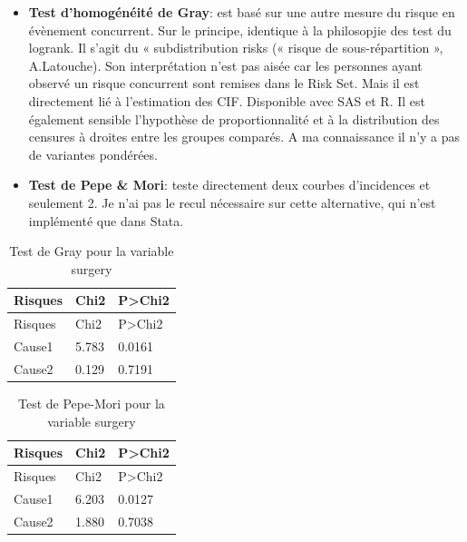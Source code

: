 \documentclass[
  12pt,
  letterpaper,
  DIV=11,
  numbers=noendperiod,
  onepage,
  openany]{scrreprt}
\begin{document}
\begin{itemize}
\item
  \textbf{Test d'homogénéité de Gray}: est basé sur une autre mesure du
  risque en évènement concurrent. Sur le principe, identique à la
  philosopjie des test du logrank. Il s'agit du « subdistribution risks
  (« risque de sous-répartition », A.Latouche). Son interprétation n'est
  pas aisée car les personnes ayant observé un risque concurrent sont
  remises dans le Risk Set. Mais il est directement lié à l'estimation
  des CIF. Disponible avec SAS et R. Il est également sensible
  l'hypothèse de proportionnalité et à la distribution des censures à
  droites entre les groupes comparés. A ma connaissance il n'y a pas de
  variantes pondérées.
\item
  \textbf{Test de Pepe \& Mori}: teste directement deux courbes
  d'incidences et seulement 2. Je n'ai pas le recul nécessaire sur cette
  alternative, qui n'est implémenté que dans Stata.
\end{itemize}

\begin{longtable}[]{@{}lll@{}}
\caption{Test de Gray pour la variable surgery}\tabularnewline
\toprule\noalign{}
Risques & Chi2 & P\textgreater Chi2 \\
\midrule\noalign{}
\endfirsthead
\toprule\noalign{}
Risques & Chi2 & P\textgreater Chi2 \\
\midrule\noalign{}
\endhead
\bottomrule\noalign{}
\endlastfoot
Cause1 & 5.783 & 0.0161 \\
Cause2 & 0.129 & 0.7191 \\
\end{longtable}

\begin{longtable}[]{@{}lll@{}}
\caption{Test de Pepe-Mori pour la variable surgery}\tabularnewline
\toprule\noalign{}
Risques & Chi2 & P\textgreater Chi2 \\
\midrule\noalign{}
\endfirsthead
\toprule\noalign{}
Risques & Chi2 & P\textgreater Chi2 \\
\midrule\noalign{}
\endhead
\bottomrule\noalign{}
\endlastfoot
Cause1 & 6.203 & 0.0127 \\
Cause2 & 1.880 & 0.7038 \\
\end{longtable}
\end{document}
